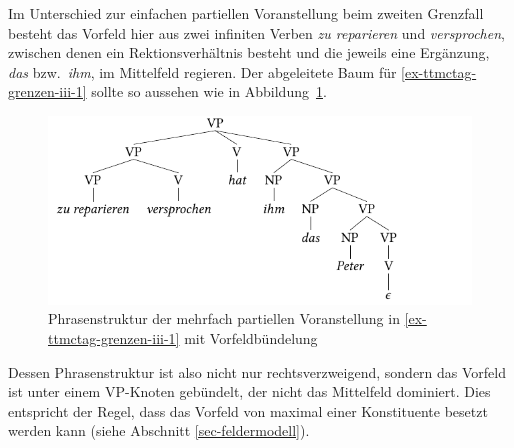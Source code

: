 Im Unterschied zur einfachen partiellen Voranstellung beim zweiten Grenzfall besteht das Vorfeld hier aus zwei infiniten Verben {\it zu reparieren} und {\it versprochen}, zwischen denen ein Rektionsverhältnis besteht und die jeweils eine Ergänzung, {\it das} bzw.\ {\it ihm}, im Mittelfeld regieren. Der abgeleitete Baum für \ref{ex-ttmctag-grenzen-iii-1} sollte so aussehen wie in Abbildung~\ref{fig-ttmctag-grenzen-iii}. 
\begin{figure}[t]
\centering
\includegraphics{graphics/abb736.pdf}
\caption{\label{fig-ttmctag-grenzen-iii}Phrasenstruktur der mehrfach partiellen Voranstellung in \ref{ex-ttmctag-grenzen-iii-1} mit Vor\-feld\-bündelung}
\end{figure}
Dessen Phrasenstruktur ist also nicht nur rechtsverzweigend, sondern das Vorfeld ist unter einem VP-Knoten gebündelt, der nicht das Mittelfeld dominiert. Dies entspricht der Regel, dass das Vorfeld von maximal einer Konstituente besetzt werden kann (siehe Abschnitt \ref{sec-feldermodell}).    

